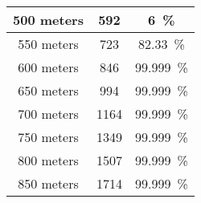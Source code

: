 \begin{table}[H]
\begin{tabular}{|c|c|c|}
        500 meters         & 592   & 6~\%        \\\hline %
        550 meters         & 723   & 82.33~\%    \\\hline %
        600 meters         & 846   & 99.999~\%   \\\hline %
        650 meters         & 994   & 99.999~\%   \\\hline %
        700 meters         & 1164  & 99.999~\%   \\\hline %
        750 meters         & 1349  & 99.999~\%   \\\hline %
        800 meters         & 1507  & 99.999~\%   \\\hline %
        850 meters         & 1714  & 99.999~\%   \\\hline %

\end{tabular}
\end{table}
